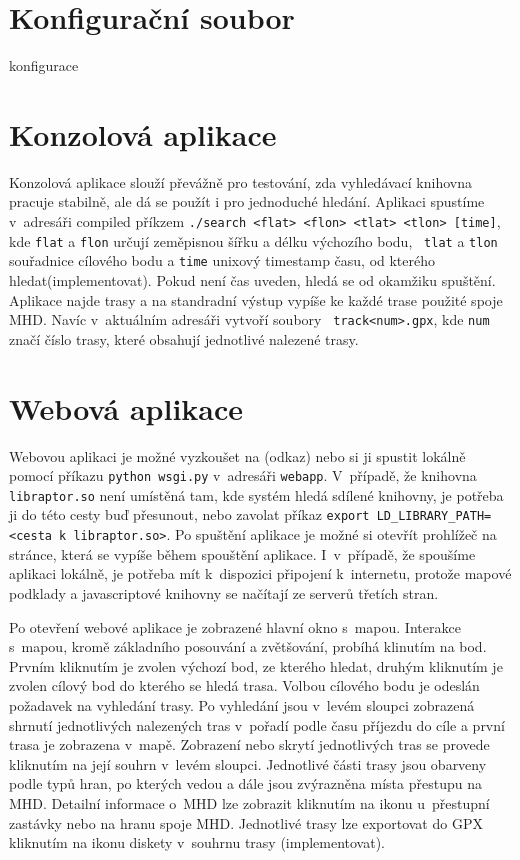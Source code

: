 \section{Konfigurační soubor}
\TODO konfigurace

\section{Konzolová aplikace}
Konzolová aplikace slouží převážně pro testování, zda vyhledávací knihovna
pracuje stabilně, ale dá se použít i pro jednoduché hledání. Aplikaci spustíme
v~adresáři compiled příkzem {\tt ./search <flat> <flon> <tlat> <tlon> [time]},
kde {\tt flat} a {\tt flon} určují zeměpisnou šířku a délku výchozího bodu, {\tt
tlat} a {\tt tlon} souřadnice cílového bodu a {\tt time} unixový timestamp času,
od kterého hledat(\TODO implementovat). Pokud není čas uveden, hledá se od
okamžiku spuštění.  Aplikace najde trasy a na standradní výstup vypíše ke každé
trase použité spoje MHD. Navíc v~aktuálním adresáři vytvoří soubory {\tt
track<num>.gpx}, kde {\tt num} značí číslo trasy, které obsahují jednotlivé
nalezené trasy.
 
\section{Webová aplikace}
Webovou aplikaci je možné vyzkoušet na (\TODO odkaz) nebo si ji spustit lokálně
pomocí příkazu {\tt python wsgi.py} v~adresáři {\tt webapp}. V~případě, že knihovna
{\tt libraptor.so} není umístěná tam, kde systém hledá sdílené knihovny, je potřeba ji
do této cesty buď přesunout, nebo zavolat příkaz {\tt export
LD\_LIBRARY\_PATH=<cesta k~libraptor.so>}. Po spuštění aplikace je možné si
otevřít prohlížeč na stránce, která se vypíše během spouštění aplikace.
I~v~případě, že spoušíme aplikaci lokálně, je potřeba mít k~dispozici připojení
k~internetu, protože mapové podklady a javascriptové knihovny se načítají ze
serverů třetích stran.

Po otevření webové aplikace je zobrazené hlavní okno s~mapou. Interakce s~mapou,
kromě základního posouvání a zvětšování, probíhá klinutím na bod. Prvním
kliknutím je zvolen výchozí bod, ze kterého hledat, druhým kliknutím je zvolen
cílový bod do kterého se hledá trasa. Volbou cílového bodu je odeslán požadavek
na vyhledání trasy. Po vyhledání jsou v~levém sloupci zobrazená shrnutí
jednotlivých nalezených tras v~pořadí podle času příjezdu do cíle a první trasa
je zobrazena v~mapě. Zobrazení nebo skrytí jednotlivých tras se provede
kliknutím na její souhrn v~levém sloupci. Jednotlivé části trasy jsou obarveny
podle typů hran, po kterých vedou a dále jsou zvýrazněna místa přestupu na MHD.
Detailní informace o~MHD lze zobrazit kliknutím na ikonu u~přestupní zastávky
nebo na hranu spoje MHD. Jednotlivé trasy lze exportovat do GPX kliknutím na
ikonu diskety v~souhrnu trasy (\TODO implementovat). 
